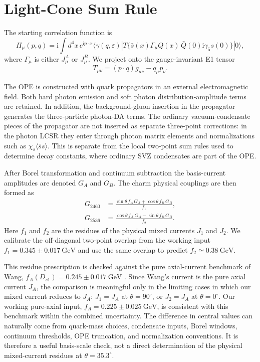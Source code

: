 \documentclass[11pt]{article}
\newcommand{\ii}{\mathrm{i}}
\newcommand{\GeV}{\mathrm{GeV}}
\newcommand{\ssbar}{\langle\bar s s\rangle}
\begin{document}
\section{Light-Cone Sum Rule}

The starting correlation function is
\begin{equation}
  \Pi_\mu(p,q)=\ii\int d^4x\,e^{\ii p\cdot x}
  \langle\gamma(q,\varepsilon)|
  T\{\bar s(x)\Gamma_\mu Q(x)\,\bar Q(0)\ii\gamma_5 s(0)\}
  |0\rangle ,
  \label{eq:correlator}
\end{equation}
where $\Gamma_\mu$ is either $J^A_\mu$ or $J^B_\mu$.  We project onto the
gauge-invariant E1 tensor
\begin{equation}
  T_{\mu\nu}=(p\cdot q)g_{\mu\nu}-q_\mu p_\nu .
\end{equation}

The OPE is constructed with quark propagators in an external electromagnetic
field.  Both hard photon emission and soft photon distribution-amplitude terms
are retained.  In addition, the background-gluon insertion in the propagator
generates the three-particle photon-DA terms.  The ordinary vacuum-condensate
pieces of the propagator are not inserted as separate three-point corrections:
in the photon LCSR they enter through photon matrix elements and normalizations
such as $\chi_s\ssbar$.  This is separate from the local two-point sum rules
used to determine decay constants, where ordinary SVZ condensates are part of
the OPE.

After Borel transformation and continuum subtraction the basis-current
amplitudes are denoted $G_A$ and $G_B$.  The charm physical couplings are then
formed as
\begin{align}
  G_{2460} &=
  \frac{\sin\theta\,f_A\,G_A+\cos\theta\,f_B\,G_B}{f_1},\\
  G_{2536} &=
  \frac{\cos\theta\,f_A\,G_A-\sin\theta\,f_B\,G_B}{f_2}.
  \label{eq:stage3}
\end{align}
Here $f_1$ and $f_2$ are the residues of the physical mixed currents
$J_1$ and $J_2$.  We calibrate the off-diagonal two-point overlap from the
working input $f_1=0.345\pm0.017~\GeV$ and use the same overlap to predict
$f_2\simeq0.38~\GeV$.

This residue prescription is checked against the pure axial-current benchmark
of Wang, $f_A(D_{s1})=0.245\pm0.017~\GeV$ \cite{Wang2015}.  Since Wang's current
is the pure axial current $J_A$, the comparison is meaningful only in the
limiting cases in which our mixed current reduces to $J_A$: $J_1=J_A$ at
$\theta=90^\circ$, or $J_2=J_A$ at $\theta=0^\circ$.  Our working pure-axial
input, $f_A=0.225\pm0.025~\GeV$, is consistent with this benchmark within the
combined uncertainty.  The difference in central values can naturally come from
quark-mass choices, condensate inputs, Borel windows, continuum thresholds, OPE
truncation, and normalization conventions.  It is therefore a useful basis-scale
check, not a direct determination of the physical mixed-current residues at
$\theta=35.3^\circ$.
\end{document}
